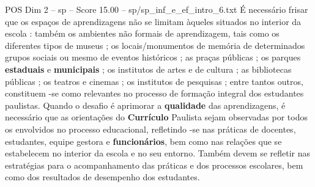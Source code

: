 \begin{textsample}{POS Dim 2 – sp – Score 15.00 – sp/sp\_inf\_e\_ef\_intro\_6.txt}
É necessário frisar que os espaços de aprendizagens não se limitam àqueles situados no interior da escola : também os ambientes não formais de aprendizagem, tais como os diferentes tipos de museus ; os locais/monumentos de memória de determinados grupos sociais ou mesmo de eventos históricos ; as praças públicas ; os parques \textbf{estaduais} e \textbf{municipais} ; os institutos de artes e de cultura ; as bibliotecas públicas ; os teatros e cinemas ; os institutos de pesquisas ; entre tantos outros, constituem -se como relevantes no processo de formação integral dos estudantes paulistas.
Quando o desafio é aprimorar a \textbf{qualidade} das aprendizagens, é necessário que as orientações do \textbf{Currículo} Paulista sejam observadas por todos os envolvidos no processo educacional, refletindo -se nas práticas de docentes, estudantes, equipe gestora e \textbf{funcionários}, bem como nas relações que se estabelecem no interior da escola e no seu entorno.
Também devem se refletir nas estratégias para o acompanhamento das práticas e dos processos escolares, bem como dos resultados de desempenho dos estudantes.

\end{textsample}
